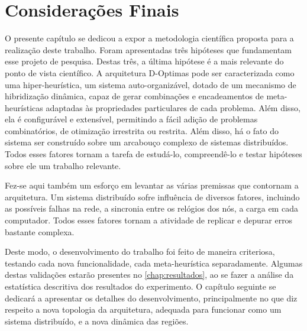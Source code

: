 \section{Considerações Finais}
O presente capítulo se dedicou a expor a metodologia científica proposta para a realização deste trabalho. Foram apresentadas três hipóteses que fundamentam esse projeto de pesquisa. Destas três, a última hipótese é a mais relevante do ponto de vista científico. A arquitetura D-Optimas pode ser caracterizada como uma hiper-heurística, um sistema auto-organizável, dotado de um mecanismo de hibridização dinâmica, capaz de gerar combinações e encadeamentos de meta-heurísticas adaptadas às propriedades particulares de cada problema. Além disso, ela é configurável e extensível, permitindo a fácil adição de problemas combinatórios, de otimização irrestrita ou restrita. Além disso, há o fato do sistema ser construído sobre um arcabouço complexo de sistemas distribuídos.  Todos esses fatores tornam a tarefa de estudá-lo, compreendê-lo e testar hipóteses sobre ele um trabalho relevante.

Fez-se aqui também um esforço em levantar as várias premissas que contornam a arquitetura. Um sistema distribuído sofre influência de diversos fatores, incluindo as possíveis falhas na rede, a sincronia entre os relógios dos nós, a carga em cada computador. Todos esses fatores tornam a atividade de replicar e depurar erros bastante complexa. 

Deste modo, o desenvolvimento do trabalho foi feito de maneira criteriosa, testando cada nova funcionalidade, cada meta-heurística separadamente. Algumas destas validações estarão presentes no \autoref{chap:resultados}, ao se fazer a análise da estatística descritiva dos resultados do experimento. O capítulo seguinte se dedicará a apresentar os detalhes do desenvolvimento, principalmente no que diz respeito a nova topologia da arquitetura, adequada para funcionar como um sistema distribuído, e a nova dinâmica das regiões. 